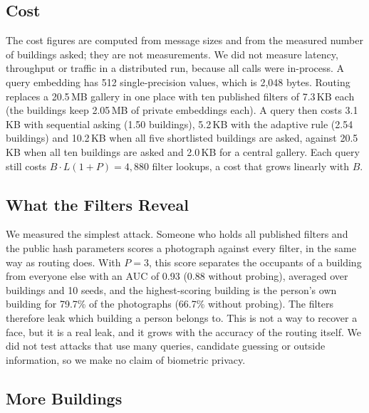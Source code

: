 \documentclass[runningheads]{llncs}
\begin{document}
\subsection{Cost}
\label{sec:cost}

The cost figures are computed from message sizes and from the measured number of buildings asked; they are not
measurements. We did not measure latency, throughput or traffic in a distributed run, because all calls were
in-process. A query embedding has 512 single-precision values, which is 2,048 bytes. Routing replaces a 20.5\,MB
gallery in one place with ten published filters of 7.3\,KB each (the buildings keep 2.05\,MB of private embeddings
each). A query then costs 3.1\,KB with sequential asking (1.50 buildings), 5.2\,KB with the
adaptive rule (2.54 buildings) and 10.2\,KB when all five shortlisted buildings are asked, against 20.5\,KB
when all ten buildings are asked and 2.0\,KB for a central gallery. Each query still costs $B\cdot L(1+P)=4{,}880$
filter lookups, a cost that grows linearly with $B$.

\subsection{What the Filters Reveal}
\label{sec:leak}

We measured the simplest attack. Someone who holds all published filters and the public hash parameters scores a
photograph against every filter, in the same way as routing does. With $P=3$, this score separates the occupants of a
building from everyone else with an AUC of 0.93 (0.88 without probing), averaged over buildings and
10 seeds, and the highest-scoring building is the person's own building for 79.7\% of the photographs
(66.7\% without probing). The filters therefore leak which building a person belongs to. This is not a way to
recover a face, but it is a real leak, and it grows with the accuracy of the routing itself. We did not test attacks
that use many queries, candidate guessing or outside information, so we make no claim of biometric privacy.

\subsection{More Buildings}
\label{sec:scale}
\end{document}
